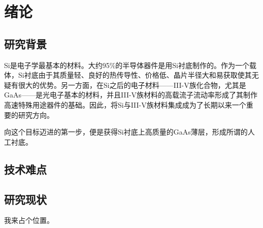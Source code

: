 % 

\chapter{绪论}

\section{研究背景}


Si是电子学最基本的材料。大约95\%的半导体器件是用Si衬底制作的。作为一个载体，Si衬底由于其质量轻、良好的热传导性、价格低、晶片半径大和易获取使其无疑有很大的优势。另一方面，在Si之后的电子材料——III-V族化合物，尤其是GaAs——是光电子基本的材料，并且III-V族材料的高载流子流动率形成了其制作高速特殊用途器件的基础。因此，将Si与III-V族材料集成成为了长期以来一个重要的研究方向。

向这个目标迈进的第一步，便是获得Si衬底上高质量的GaAs薄层，形成所谓的人工衬底。


\section{技术难点}

\section{研究现状}
我来占个位置。\cite{BUPT_Thesis_Format_2004}


\ifx\usechapbib\empty


\fi

